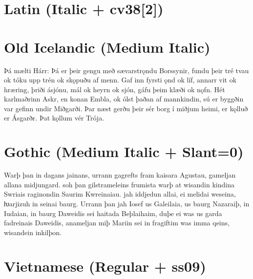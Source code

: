 \documentclass[12pt,letterpaper,openany]{book}
\begin{document}
\section{Latin (Italic + cv38[2])}

\textit{\large{}}

\section{Old Icelandic (Medium Italic)}

{\italmedium\large Þá mælti Hárr: Þá er þeir gengu með sævarstrǫndu Borssynir, fundu þeir tré tvau ok tóku upp trén ok skǫpuðu af menn. Gaf inn fyrsti ǫnd ok líf, annarr vit ok hræring, þriði ásjónu, mál ok heyrn ok sjón, gáfu þeim klæði ok nǫfn. Hét karlmaðrinn Askr, en konan Embla, ok ólst þaðan af mannkindin, sú er byggðin var gefinn undir Miðgarði. Þar næst gerðu þeir sér borg í miðjum heimi, er kǫlluð er Ásgarðr. Þat kǫllum vér Trója.}

\section{Gothic (Medium Italic + Slant=0)}

{\italslantedmedium\large Warþ þan in dagans jainans, urrann gagrefts fram kaisara Agustau, gameljan allana midjungard. soh þan gilstrameleins frumista warþ at wisandin kindina Swriais raginondin Saurim Kwreinaiau. jah iddjedun allai, ei melidai weseina, ƕarjizuh in seinai baurg. Urrann þan jah Iosef us Galeilaia, us baurg Nazaraiþ, in Iudaian, in baurg Daweidis sei haitada Beþlaihaim, duþe ei was us garda fadreinais Daweidis, anameljan miþ Mariin sei in fragiftim was imma qeins, wisandein inkilþon.}

\section{Vietnamese (Regular + ss09)}
\end{document}
